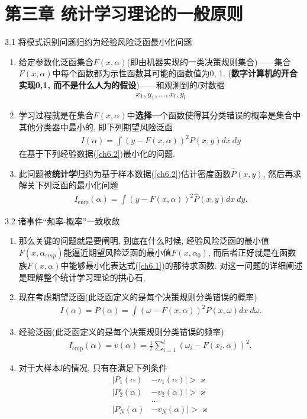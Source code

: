 \documentclass[compress,10pt,dvipsnames,notheorems]{beamer} %
\begin{document}
\section{第三章 统计学习理论的一般原则}
\begin{frame}{3.1 将模式识别问题归约为经验风险泛函最小化问题}
\begin{enumerate}
\item 给定参数化泛函集合$F(x, \alpha)$(即由机器实现的一类决策规则集合)——集合$F(x, \alpha)$中每个函数都为示性函数其可能的函数值为0, 1. (\textbf{数字计算机的开合实现{0,1}, 而不是什么人为的假设})——和观测到的$l$对数据
\begin{align}
\label{ch6.2}
x_{1}, y_{1}, \ldots, x_{l}, y_{l}
\end{align}
\item 学习过程就是在集合$F(x,\alpha)$中\textbf{选择}一个函数使得其分类错误的概率是集合中其他分类器中最小的, 即下列期望风险泛函
\begin{align}\label{ch6.1}
I(\alpha)=\int(y-F(x, \alpha))^{2} P(x, y) d x ~d y
\end{align}
在基于下列经验数据(\ref{ch6.2})最小化的问题. 
\item 此问题被\textbf{统计学}归约为基于样本数据(\ref{ch6.2})估计密度函数$\hat{P}(x,y)$, 然后再求解关下列泛函的最小化问题
\begin{align*}
I_{\mathrm{emp}}(\alpha)=\int(y-F(x, \alpha))^{2} \hat{P}(x, y) d x ~d y.
\end{align*}
\end{enumerate}
\end{frame}

\begin{frame}{3.2 诸事件“频率-概率”一致收敛}
\begin{enumerate}
\item 那么关键的问题就是要阐明, 到底在什么时候, 经验风险泛函的最小值$F(x,\alpha_{emp})$能逼近期望风险泛函的最小值$F(x,\alpha_0)$, 而后者正好就是在函数族$F(x,\alpha)$中能够最小化表达式(\ref{ch6.1})的那待求函数. 对这一问题的详细阐述是理解整个统计学习理论的拱心石.
\item 现在考虑期望泛函(此泛函定义的是每个决策规则分类错误的概率)
\begin{align}\label{ch6.10}
I(\alpha)=P(\alpha)=\int(\omega-F(x, \alpha))^{2} P(x, \omega) dx~d\omega.
\end{align}
\item 经验泛函(此泛函定义的是每个决策规则分类错误的频率)
\begin{align}\label{ch6.11}
I_{\mathrm{emp}}(\alpha)=v(\alpha)=\frac{1}{l} \sum_{i=1}^{l}\left(\omega_{i}-F\left(x_{i}, \alpha\right)\right)^{2},
\end{align}
\item 对于大样本$l$的情况, 只有在满足下列条件
\begin{align*}
|P_{1}(\alpha)&-v_{1}(\alpha)|>\varkappa\\
|P_{2}(\alpha)&-v_{2}(\alpha)|>\varkappa\\
&\ldots\\
|P_{N}(\alpha)&-v_{N}(\alpha)|>\varkappa
\end{align*}
\end{enumerate}
\end{frame}
\end{document}

